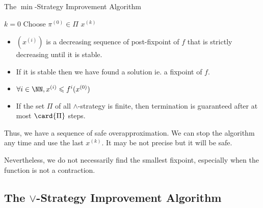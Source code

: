\documentclass[a4paper, twoside, 10pt]{article}
\begin{document}
\begin{algorithm}
    \caption{The $\min$-Strategy Improvement Algorithm}
    \DontPrintSemicolon
    $k = 0$\;
    Choose $\pi^{(0)} \in \Pi$\;
    \Return $x^{(k)}$
\end{algorithm}

\begin{theorem}
    \begin{itemize}
        \item $(x^{(i)})$ is a decreasing sequence of post-fixpoint of $f$ that is strictly decreasing until it is stable.
        \item If it is stable then we have found a solution ie. a fixpoint of $f$.
        \item $\forall i\in\NN, x^{(i)} \leqslant f^i(x^{(0)})$
        \item If the set $\Pi$ of all $\wedge$-strategy is finite, then termination is guaranteed after at most $\card{\Pi}$ steps.
    \end{itemize}
\end{theorem}


Thus, we have a sequence of safe overapproximation. We can stop the algorithm any time and use the last $x^{(k)}$. It may be not precise but it will be safe.

Nevertheless, we do not necessarily find the smallest fixpoint, especially when the function is not a contraction.

\subsection{The \texorpdfstring{$\vee$}{Max}-Strategy Improvement Algorithm}
\end{document}
